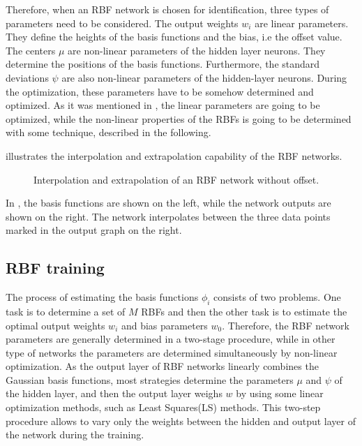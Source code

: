 \vspace{-3mm}

Therefore, when an RBF network is chosen for identification, three types of parameters need to be considered. The output weights $w_i$ are linear parameters. They define the heights of the basis functions and the bias, i.e the offset value. The centers $\mu$ are non-linear parameters of the hidden layer neurons. They determine the positions of the basis functions. Furthermore, the standard deviations $\psi$ are also non-linear parameters of the hidden-layer neurons. During the optimization, these parameters have to be somehow determined and optimized. As it was mentioned in , the linear parameters are going to be optimized, while the non-linear properties of the RBFs is going to be determined with some technique, described in the following. 

 illustrates the interpolation and extrapolation capability of the RBF networks. 

\begin{figure}[H]
\centering
 
\caption{Interpolation and extrapolation of an RBF network without offset.}
\label{fig:rbf_interpol}
\end{figure}

\vspace{-3mm}

In , the basis functions are shown on the left, while the network outputs are shown on the right. The network interpolates  between the three data points marked in the output graph on the right. 

\subsection{RBF training}
\label{RBF_training}

The process of estimating the basis functions $\phi_i$ consists of two problems. One task is to determine a set of $M$ RBFs and then the other task is to estimate the optimal output weights $w_i$ and bias parameters $w_0$. Therefore, the RBF network parameters are generally determined in a two-stage procedure, while in other type of networks the parameters are determined simultaneously by non-linear optimization\cite{RBF_article}. As the output layer of RBF networks linearly combines the Gaussian basis functions, most strategies determine the parameters $\mu$ and $\psi$ of the hidden layer, and then the output layer weighs $w$ by using some linear optimization methods, such as Least Squares(LS) methods. This two-step procedure allows to vary only the weights between the hidden and output layer of the network during the training. 

